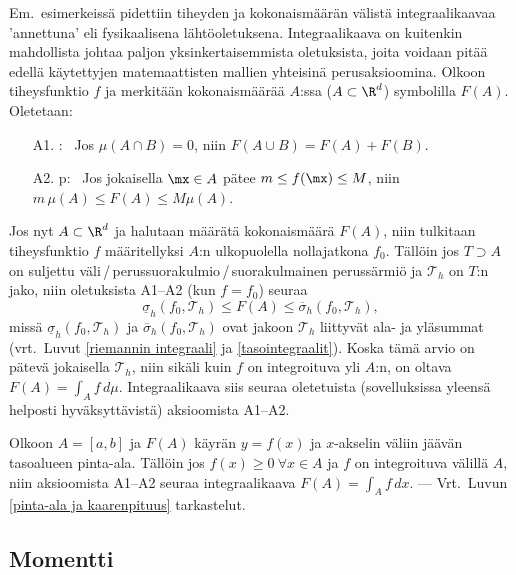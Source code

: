 Em.\ esimerkeissä pidettiin tiheyden ja kokonaismäärän välistä integraalikaavaa
'annettuna' eli fysikaalisena lähtöoletuksena. Integraalikaava on kuitenkin mahdollista 
johtaa paljon yksinkertaisemmista oletuksista, joita voidaan pitää edellä käytettyjen
matemaattisten mallien yhteisinä perusaksioomina. Olkoon tiheysfunktio $f$ ja merkitään
kokonaismäärää $A$:ssa ($A\subset\R^d$) symbolilla $F(A)$. Oletetaan:
\begin{itemize}
\item[A1.] : \ Jos $\mu(A \cap B)=0$, niin $F(A \cup B)=F(A)+F(B)$.
\item[A2.] p: \ Jos jokaisella $\mx \in A$ pätee
           $m \le f(\mx) \le M$, niin \newline $m\,\mu(A) \le F(A) \le M\mu(A)$.
\end{itemize}
Jos nyt $A\subset\R^d$ ja halutaan määrätä kokonaismäärä $F(A)$, niin tulkitaan
tiheysfunktio $f$ määritellyksi $A$:n ulkopuolella nollajatkona $f_0$. Tällöin jos 
$T \supset A$ on suljettu väli\,/\,perussuorakulmio\,/\,suorakulmainen perussärmiö ja
$\mathcal{T}_h$ on $T$:n jako, niin oletuksista A1--A2 (kun $f=f_0$) seuraa
\[
\underline{\sigma}_h(f_0,\mathcal{T}_h) \le F(A) \le \overline{\sigma}_h(f_0,\mathcal{T}_h),
\]
missä $\underline{\sigma}_h(f_0,\mathcal{T}_h)$ ja $\overline{\sigma}_h(f_0,\mathcal{T}_h)$
ovat jakoon $\mathcal{T}_h$ liittyvät ala- ja yläsummat 
(vrt.\ Luvut \ref{riemannin integraali} ja \ref{tasointegraalit}). Koska tämä arvio on pätevä
jokaisella $\mathcal{T}_h$, niin sikäli kuin $f$ on integroituva yli $A$:n, on oltava
$F(A) = \int_A f\,d\mu$. Integraalikaava siis seuraa oletetuista (sovelluksissa yleensä
helposti hyväksyttävistä) aksioomista A1--A2.
\begin{Exa} Olkoon $A=[a,b]$ ja $F(A)$ käyrän $y=f(x)$ ja $x$-akselin väliin
jäävän tasoalueen pinta-ala. Tällöin jos $f(x) \ge 0\ \forall x \in A$ ja $f$ on 
integroituva välillä $A$, niin aksioomista A1--A2 seuraa integraalikaava 
$F(A)=\int_A f\,dx$. --- Vrt.\ Luvun \ref{pinta-ala ja kaarenpituus} tarkastelut.
\end{Exa} 

\subsection{Momentti}

